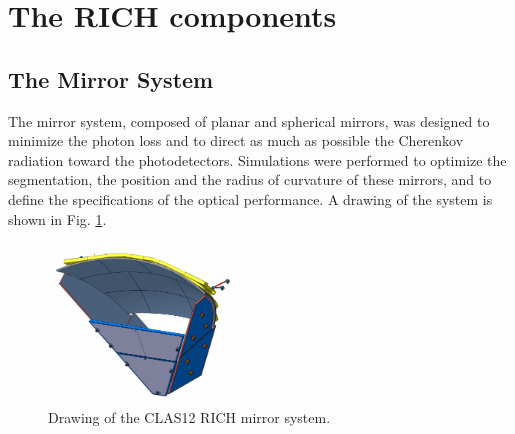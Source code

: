 \documentclass[5p,times,twocolumn]{elsarticle}
\begin{document}

\section{The RICH components}

\subsection{The Mirror System}

The mirror system, composed of planar and spherical mirrors, was designed to minimize the photon loss and to direct as much as possible the Cherenkov radiation toward the photodetectors.
Simulations were performed to optimize the segmentation, the position and the radius of curvature of these mirrors, and to define the specifications of the optical performance.
A drawing of the system is shown in Fig. \ref{Fig:RICHmirrors}.


\begin{figure}
\begin{center}
\includegraphics[width=0.45\textwidth]{RICHmirrors.pdf}
\caption{Drawing of the CLAS12 RICH mirror system.}
\label{Fig:RICHmirrors}
\end{center}
\end{figure}

\end{document}
